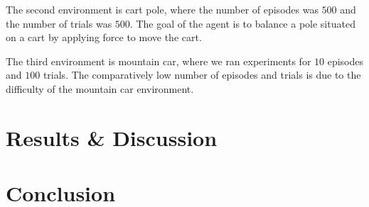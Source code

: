 \documentclass{article}
\begin{document}
  The second environment is cart pole, where the number of episodes was $500$ and the number of trials was $500$. The goal of the agent is to balance a pole situated on a cart by applying force to move the cart.

  The third environment is mountain car, where we ran experiments for $10$ episodes and $100$ trials. The comparatively low number of episodes and trials is due to the difficulty of the mountain car environment.

  \section{Results \& Discussion}


  \section{Conclusion}

  
  
\end{document}
